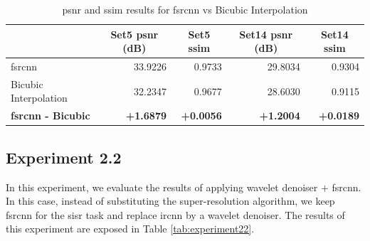 \begin{table}[]
	\centering
	\begin{tabular}{|l|r|r|r|r|}
		\hline
		\rowcolor[HTML]{EFEFEF}
		\multicolumn{1}{|c}{\cellcolor[HTML]{EFEFEF}\textbf{Method}} &
		\multicolumn{1}{c|}{\cellcolor[HTML]{EFEFEF}\textbf{Set5 \gls{psnr} (dB)}} & \multicolumn{1}{c|}{\cellcolor[HTML]{EFEFEF}\textbf{Set5 \gls{ssim}}} & \multicolumn{1}{c|}{\cellcolor[HTML]{EFEFEF}\textbf{Set14 \gls{psnr} (dB)}} & \multicolumn{1}{c|}{\cellcolor[HTML]{EFEFEF}\textbf{Set14 \gls{ssim}}} \\ \hline
		\rowcolor[HTML]{FFFFFF} 
		\gls{fsrcnn} & 33.9226 & 0.9733 & 29.8034 & 0.9304\\
		\rowcolor[HTML]{EFEFEF} 
		Bicubic Interpolation & 32.2347 & 0.9677 & 28.6030 & 0.9115\\\hline
		\textbf{\gls{fsrcnn} - Bicubic} & \textbf{+1.6879} & \textbf{+0.0056} & \textbf{+1.2004} & \textbf{+0.0189}\\\hline
	\end{tabular}
	\caption{\gls{psnr} and \gls{ssim} results for \gls{fsrcnn} vs Bicubic Interpolation}
	\label{tab:experiment}
\end{table}

\newpage\subsection{Experiment 2.2}
In this experiment, we evaluate the results of applying wavelet denoiser $+$ \gls{fsrcnn}. In this case, instead of substituting the super-resolution algorithm, we keep \gls{fsrcnn} for the \gls{sisr} task and replace \gls{ircnn} by a wavelet denoiser. The results of this experiment are exposed in Table \ref{tab:experiment22}.

